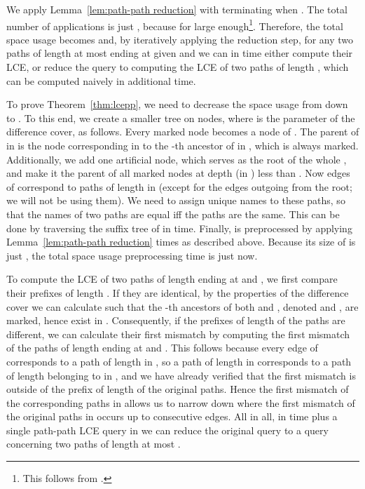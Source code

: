 \documentclass [10pt]{article}
\begin{document}
We apply Lemma~\ref{lem:path-path reduction} with  terminating when .
The total number of applications is just ,
because  for  large enough\footnote{This follows from
.}. Therefore, the total space usage becomes  and, by iteratively applying the reduction step,
for any two paths of length at most  ending at given  and  we can in  time either compute their LCE,
or reduce the query to computing the LCE of two paths of length , which can be computed naively in additional
 time.

To prove Theorem~\ref{thm:lcepp}, we need to decrease the space usage from  down to .
To this end, we create a smaller tree  on  nodes, where  is the parameter of the difference cover, as follows. 
Every marked node  becomes a node of . The parent of  in  is the node corresponding in  to the -th ancestor
of  in , which is always marked. Additionally, we add one artificial node, which serves as the root of the whole , and make it the parent
of all marked nodes at depth (in ) less than . Now edges of  correspond to paths of length  in  (except for the
edges outgoing from the root; we will not be using them). We need to assign unique names to these paths, so that the
names of two paths are equal iff the paths are the same. This can be done by traversing the suffix tree of  in  time.
Finally,  is preprocessed by applying Lemma~\ref{lem:path-path reduction}  times as described above. Because
its size of  is just , the total space usage preprocessing time is just  now.

To compute the LCE of two paths of length  ending at  and , we first compare their
prefixes of length . If they are identical, by the properties of the difference cover we can calculate  such that
the -th ancestors of both  and , denoted  and , are marked, hence exist in . Consequently, if the prefixes of length
 of the paths are different, we can calculate their first mismatch by computing the first mismatch of the paths of length
 ending at  and . This follows because every edge of  corresponds to a path of length
 in , so a path of length  in  corresponds to a path of length belonging to 
in , and we have already verified that the first mismatch is outside of the prefix of length  of the original paths.
Hence the first mismatch of the corresponding paths in  allows us to narrow down where the first mismatch of the original paths in 
occurs up to  consecutive edges.
All in all, in  time plus a single path-path LCE query in  we can reduce the original query to a query concerning
two paths of length at most .
\end{document}
